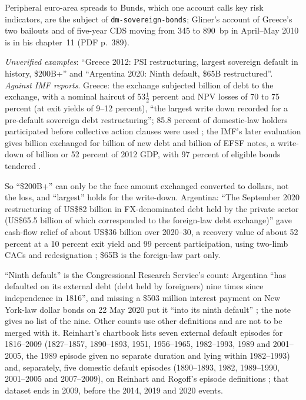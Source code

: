 \begin{qfdefinition}
 Peripheral euro-area spreads to Bunds, which one account calls key risk indicators, are the subject of \nolinkurl{dm-sovereign-bonds}; Gliner's account of Greece's two bailouts and of five-year CDS moving from 345 to 890~bp in April--May 2010 is in his chapter~11 (PDF p.~389).

 \emph{Unverified examples}: ``Greece 2012: PSI restructuring, largest sovereign default in history, \$200B+'' and ``Argentina 2020: Ninth default, \$65B restructured''. \emph{Against IMF reports}. Greece: the exchange subjected  billion of debt to the exchange, with a nominal haircut of 53$\tfrac12$ percent and NPV losses of 70 to 75 percent (at exit yields of 9--12 percent), ``the largest write down recorded for a pre-default sovereign debt restructuring''; 85.8 percent of domestic-law holders participated before collective action clauses were used \citep[PDF p.~46]{imf-cr-12-57}; the IMF's later evaluation gives  billion exchanged for  billion of new debt and  billion of EFSF notes, a write-down of  billion or 52 percent of 2012 GDP, with 97 percent of eligible bonds tendered \citep[PDF pp.~45--46]{imf-cr-17-44}.

So ``\$200B+'' can only be the face amount exchanged converted to dollars, not the loss, and ``largest'' holds for the write-down. Argentina: ``The September 2020 restructuring of US\$82 billion in FX-denominated debt held by the private sector (US\$65.5 billion of which corresponded to the foreign-law debt exchange)'' gave cash-flow relief of about US\$36 billion over 2020--30, a recovery value of about 52 percent at a 10 percent exit yield and 99 percent participation, using two-limb CACs and redesignation \citep[Box~4, PDF p.~42]{imf-cr-22-92}; \$65B is the foreign-law part only.

``Ninth default'' is the Congressional Research Service's count: Argentina ``has defaulted on its external debt (debt held by foreigners) nine times since independence in 1816'', and missing a \$503 million interest payment on New York-law dollar bonds on 22 May 2020 put it ``into its ninth default'' \citep[pp.~1--2]{crs-if10991-v6}; the note gives no list of the nine. Other counts use other definitions and are not to be merged with it. Reinhart's chartbook lists seven external default episodes for 1816--2009 (1827--1857, 1890--1893, 1951, 1956--1965, 1982--1993, 1989 and 2001--2005, the 1989 episode given no separate duration and lying within 1982--1993) and, separately, five domestic default episodes (1890--1893, 1982, 1989--1990, 2001--2005 and 2007--2009), on Reinhart and Rogoff's episode definitions \citep[Figure~3a and table, printed p.~16, PDF p.~17]{reinhart-chartbook-2010}; that dataset ends in 2009, before the 2014, 2019 and 2020 events.


\end{qfdefinition}
